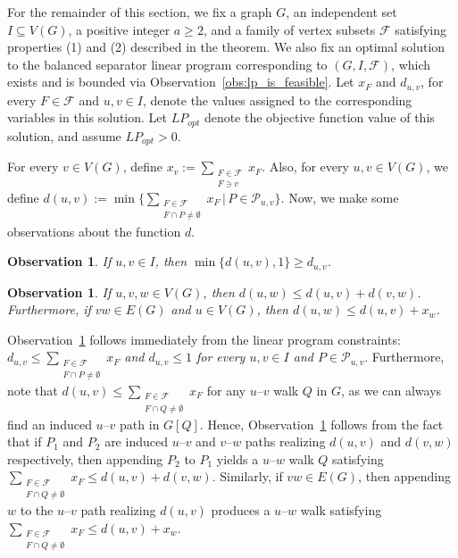 \documentclass[11pt]{amsart}
\newtheorem{observation}[theorem]{Observation}
\newcommand{\lpopt}{LP_{opt}}
\begin{document}
For the remainder of this section, we fix a graph $G$, an independent set $I \subseteq V(G)$, a positive integer $a\geq 2$, and a family of vertex subsets $\mathcal{F}$ satisfying properties (1) and (2) described in the theorem. We also fix an optimal solution to the balanced separator linear program corresponding to $(G, I, \mathcal{F})$, which exists and is bounded via Observation~\ref{obs:lp_is_feasible}. Let $x_F$ and $d_{u,v}$, for every $F \in \mathcal{F}$ and $u,v\in I$, denote the values assigned to the corresponding variables in this solution. Let $\lpopt$ denote the objective function value of this solution, and assume $\lpopt > 0$.

For every $v \in V(G)$, define $x_v := \sum_{\substack{F \in \mathcal{F} \\ F \ni v}} x_F$. Also, for every $u, v \in V(G)$, we define $d(u,v) := \min\{ \sum_{\substack{F \in \mathcal{F} \\ F \cap P \neq \emptyset}} x_F \,|\, P \in \mathcal{P}_{u,v} \}$. Now, we make some observations about the function $d$.

\begin{observation}\label{obs:distance_defintions_match}
    If $u, v \in I$, then $\min\{d(u,v), 1\} \geq d_{u,v}$.
\end{observation}

\begin{observation}\label{obs:triangle_inequality}
    If $u,v,w \in V(G)$, then $d(u,w) \leq d(u,v) + d(v,w)$. Furthermore, if $vw \in E(G)$ and $u \in V(G)$, then $d(u,w) \leq d(u,v) + x_w$. 
\end{observation}

Observation~\ref{obs:distance_defintions_match} follows immediately from the linear program constraints: \emph{$d_{u,v} \leq \sum_{\substack{F\in \mathcal{F}\\ F\cap P \neq\emptyset}} x_F$ and $d_{u,v} \leq 1$ for every $u,v\in I$ and $P\in\mathcal{P}_{u,v}$}. Furthermore, note that $d(u,v) \leq \sum_{\substack{F \in \mathcal{F} \\ F \cap Q \neq \emptyset}} x_F$ for any $u$--$v$ walk $Q$ in $G$, as we can always find an induced $u$--$v$ path in $G[Q]$. Hence, Observation~\ref{obs:triangle_inequality} follows from the fact that if $P_1$ and $P_2$ are induced $u$--$v$ and $v$--$w$ paths realizing $d(u,v)$ and $d(v,w)$ respectively, then appending $P_2$ to $P_1$ yields a $u$--$w$ walk $Q$ satisfying $\sum_{\substack{F \in \mathcal{F} \\ F \cap Q \neq \emptyset}} x_F \leq d(u,v) + d(v,w)$. Similarly, if $vw \in E(G)$, then appending $w$ to the $u$--$v$ path realizing $d(u,v)$ produces a $u$--$w$ walk satisfying $\sum_{\substack{F \in \mathcal{F} \\ F \cap Q \neq \emptyset}} x_F \leq d(u,v) + x_w$.\\
\end{document}
